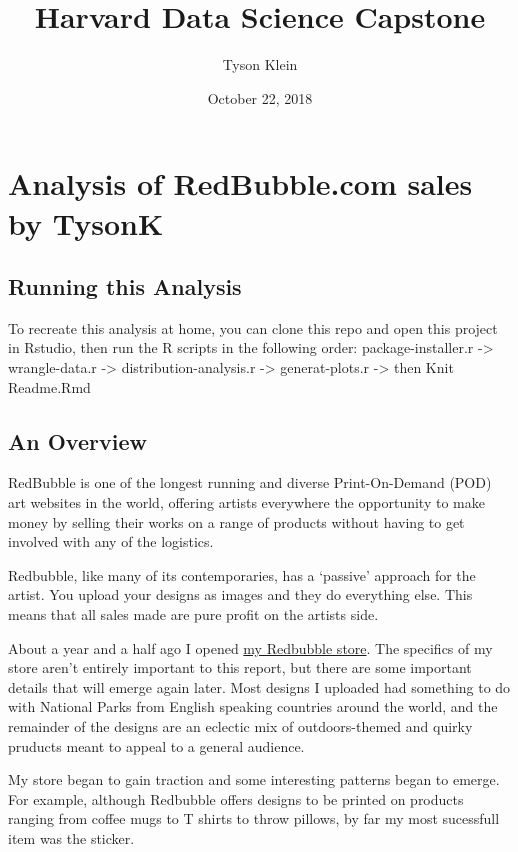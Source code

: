 \documentclass[]{article}
\title{Harvard Data Science Capstone}
\author{Tyson Klein}
\date{October 22, 2018}
\begin{document}
\maketitle

\section{Analysis of RedBubble.com sales by
TysonK}\label{analysis-of-redbubble.com-sales-by-tysonk}

\subsection{Running this Analysis}\label{running-this-analysis}

To recreate this analysis at home, you can clone this repo and open this
project in Rstudio, then run the R scripts in the following order:
package-installer.r -\textgreater{} wrangle-data.r -\textgreater{}
distribution-analysis.r -\textgreater{} generat-plots.r -\textgreater{}
then Knit Readme.Rmd

\subsection{An Overview}\label{an-overview}

RedBubble is one of the longest running and diverse Print-On-Demand
(POD) art websites in the world, offering artists everywhere the
opportunity to make money by selling their works on a range of products
without having to get involved with any of the logistics.

Redbubble, like many of its contemporaries, has a `passive' approach for
the artist. You upload your designs as images and they do everything
else. This means that all sales made are pure profit on the artists
side.

About a year and a half ago I opened
\href{https://www.redbubble.com/people/tysonk?ref=account-nav-dropdown\&asc=u}{my
Redbubble store}. The specifics of my store aren't entirely important to
this report, but there are some important details that will emerge again
later. Most designs I uploaded had something to do with National Parks
from English speaking countries around the world, and the remainder of
the designs are an eclectic mix of outdoors-themed and quirky pruducts
meant to appeal to a general audience.

My store began to gain traction and some interesting patterns began to
emerge. For example, although Redbubble offers designs to be printed on
products ranging from coffee mugs to T shirts to throw pillows, by far
my most sucessfull item was the sticker.
\end{document}
